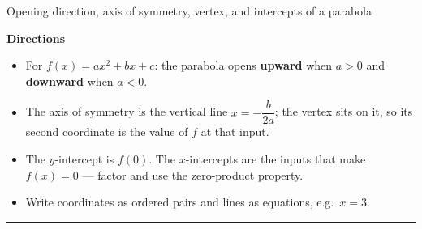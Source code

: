 \documentclass[12pt]{article}
\begin{document}

\begin{center}
\small Opening direction, axis of symmetry, vertex, and intercepts of a parabola
\end{center}
\vspace{0.15cm}

\noindent\textbf{Directions}
\begin{itemize}[leftmargin=0.8cm, itemsep=1pt, topsep=2pt]
  \item For $f(x) = ax^2 + bx + c$: the parabola opens \textbf{upward} when $a > 0$ and \textbf{downward} when $a < 0$.
  \item The axis of symmetry is the vertical line $x = -\dfrac{b}{2a}$; the vertex sits on it, so its second coordinate is the value of $f$ at that input.
  \item The $y$-intercept is $f(0)$. The $x$-intercepts are the inputs that make $f(x) = 0$ --- factor and use the zero-product property.
  \item Write coordinates as ordered pairs and lines as equations, e.g.\ $x = 3$.
\end{itemize}

\vspace{0.2cm}
\noindent\rule{\linewidth}{0.4pt}



\end{document}
